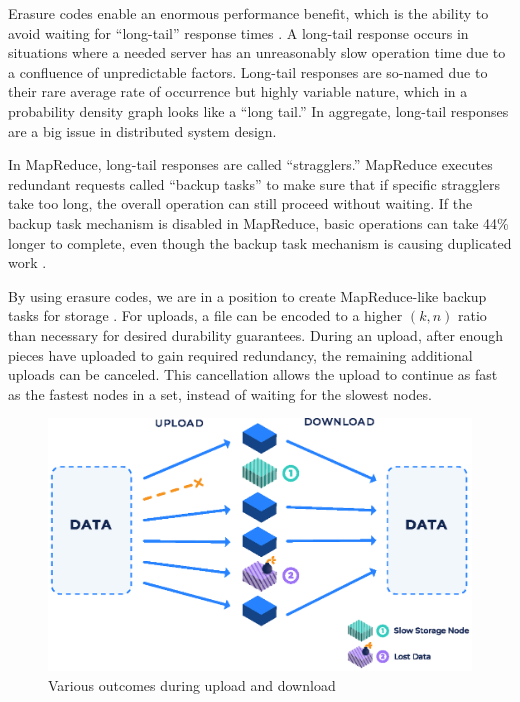 \documentclass[8pt,fleqn,openany]{book}
\begin{document}
Erasure codes enable an enormous performance benefit, which is the ability to
avoid waiting for ``long-tail'' response times \cite{tail-at-scale}. A
long-tail response occurs in situations where a needed server has an
unreasonably slow operation time due to a confluence of unpredictable factors.
Long-tail responses are so-named due to their rare average rate of occurrence
but highly variable nature, which in a probability density graph looks like a
``long tail.''
In aggregate, long-tail responses are a big issue in distributed system design.

In MapReduce, long-tail responses are called ``stragglers.''
MapReduce executes redundant requests called ``backup tasks'' to make
sure that if specific stragglers take too long, the overall operation can still
proceed without waiting. If the backup task mechanism is disabled in MapReduce,
basic operations can take 44\% longer to complete, even though
the backup task mechanism is causing duplicated work \cite{mapreduce}.

By using erasure codes, we are in a position to create MapReduce-like
backup tasks for storage \cite{rs-stragglers, rs-intro}.
For uploads, a file can be encoded to a higher $(k, n)$ ratio than
necessary for desired durability guarantees.
During an upload, after enough pieces have uploaded to gain required
redundancy, the remaining additional uploads can be canceled.
This cancellation allows the upload to continue as fast as the fastest nodes
in a set, instead of waiting for the slowest nodes.

\begin{figure}[!htbp]
\centering
\includegraphics[height=.35\textheight]{images/redundancy.eps}
\caption{Various outcomes during upload and download}
\end{figure}
\end{document}
